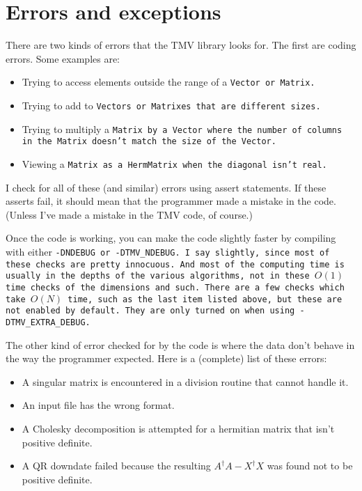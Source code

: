 
\section{Errors and exceptions}
\label{Exceptions}

There are two kinds of errors that the TMV library looks for.  The first are 
coding errors.  Some examples are:
\begin{itemize}
\item
Trying to access elements outside the range of a \tt{Vector} or \tt{Matrix}.
\item
Trying to add to \tt{Vector}s or \tt{Matrix}es that are different sizes.
\item
Trying to multiply a \tt{Matrix} by a \tt{Vector} where the number of columns 
in the \tt{Matrix} doesn't match the size of the \tt{Vector}.
\item
Viewing a \tt{Matrix} as a \tt{HermMatrix} when the diagonal isn't real.
\end{itemize}
I check for all of these (and similar) errors using assert statements.
If these asserts fail, it should mean that
the programmer made a mistake in the code.  (Unless I've made a 
mistake in the TMV code, of course.)

Once the code is working, you can make the code slightly faster by 
compiling with either \tt{-DNDEBUG} or \tt{-DTMV\_NDEBUG}.  I say slightly, since most of these checks 
are pretty innocuous.  And most of the computing time is usually in the depths
of the various algorithms, not in these $O(1)$ time checks of the dimensions and such.  
There are a few checks which take $O(N)$ time, such as the last item listed above, but these are not enabled by default.  They are only turned on when using \tt{-DTMV\_EXTRA\_DEBUG}.

The other kind of error checked for by the code is 
where the data don't behave in the way
the programmer expected.  Here is a (complete) list of these errors:
\begin{itemize}
\item
A singular matrix is encountered in a division routine that cannot handle it.
\item
An input file has the wrong format.
\item
A Cholesky decomposition is attempted for a hermitian matrix that isn't positive definite.
\item
A QR downdate failed because the resulting $A^\dagger A - X^\dagger X$ was found not to be positive definite.
\end{itemize}

